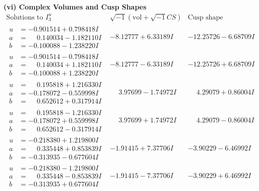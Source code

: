 \documentclass[1p]{elsarticle_modified}
\theoremstyle{definition}
\newcommand{\I}{\sqrt{-1}}
\begin{document}
\newpage\flushleft \textbf{(vi) Complex Volumes and Cusp Shapes}
$$\begin{array}{c|c|c}  
\text{Solutions to }I^u_{3}& \I (\text{vol} + \sqrt{-1}CS) & \text{Cusp shape}\\
 \hline 
\begin{aligned}
u &= -0.901514 + 0.798418 I \\
a &= \phantom{-}0.140034 - 1.182110 I \\
b &= -0.100088 - 1.238220 I\end{aligned}
 & -8.12777 + 6.33189 I & -12.25726 - 6.68709 I \\ \hline\begin{aligned}
u &= -0.901514 - 0.798418 I \\
a &= \phantom{-}0.140034 + 1.182110 I \\
b &= -0.100088 + 1.238220 I\end{aligned}
 & -8.12777 - 6.33189 I & -12.25726 + 6.68709 I \\ \hline\begin{aligned}
u &= \phantom{-}0.195818 + 1.216330 I \\
a &= -0.178072 - 0.559998 I \\
b &= \phantom{-}0.652612 + 0.317914 I\end{aligned}
 & \phantom{-}3.97699 - 1.74972 I & \phantom{-}4.29079 + 0.86004 I \\ \hline\begin{aligned}
u &= \phantom{-}0.195818 - 1.216330 I \\
a &= -0.178072 + 0.559998 I \\
b &= \phantom{-}0.652612 - 0.317914 I\end{aligned}
 & \phantom{-}3.97699 + 1.74972 I & \phantom{-}4.29079 - 0.86004 I \\ \hline\begin{aligned}
u &= -0.218380 + 1.219800 I \\
a &= \phantom{-}0.335448 + 0.853839 I \\
b &= -0.313935 - 0.677604 I\end{aligned}
 & -1.91415 + 7.37706 I & -3.90229 - 6.46992 I \\ \hline\begin{aligned}
u &= -0.218380 - 1.219800 I \\
a &= \phantom{-}0.335448 - 0.853839 I \\
b &= -0.313935 + 0.677604 I\end{aligned}
 & -1.91415 - 7.37706 I & -3.90229 + 6.46992 I \\ \hline\begin{aligned}

\end{aligned}
\end{array}$$
\end{document}
